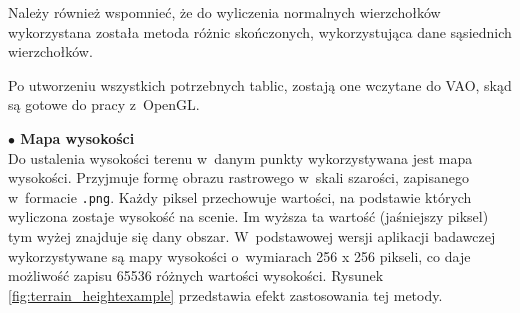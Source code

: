 \documentclass[a4paper,twoside,12pt]{book}
\begin{document}
%

Należy również wspomnieć, że do wyliczenia normalnych wierzchołków wykorzystana została metoda różnic skończonych, wykorzystująca dane sąsiednich wierzchołków.



Po utworzeniu wszystkich potrzebnych tablic, zostają one wczytane do VAO, skąd są gotowe do pracy z~OpenGL.

\vspace{\baselineskip}
\textbf{$\bullet$ Mapa wysokości} \\
Do ustalenia wysokości terenu w~danym punkty wykorzystywana jest mapa wysokości. Przyjmuje formę obrazu rastrowego w~skali szarości, zapisanego w~formacie \texttt{.png}. Każdy piksel przechowuje wartości, na podstawie których wyliczona zostaje wysokość na scenie. Im wyższa ta wartość (jaśniejszy piksel) tym wyżej znajduje się dany obszar. W~podstawowej wersji aplikacji badawczej wykorzystywane są mapy wysokości o~wymiarach 256 x 256 pikseli, co daje możliwość zapisu 65536 różnych wartości wysokości. Rysunek \ref{fig:terrain_heightexample} przedstawia efekt zastosowania tej metody.
\end{document}
